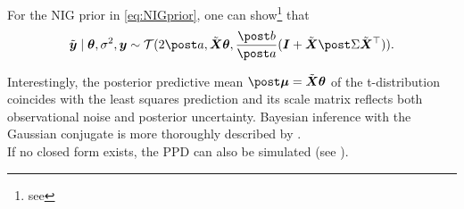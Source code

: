 For the NIG prior in \autoref{eq:NIGprior}, one can show\footnote{see } that
\begin{equation*}
    \ty \mid \btheta, \ssd, \by \sim \Tcal(2 \apo, \tX \btheta, \frac{\bpo}{\apo} (\bI + \tX \Sdpo \tX^\top)).
\end{equation*}

Interestingly, the posterior predictive mean $\mupo = \tX \btheta$ of the t-distribution coincides with the least squares prediction and its scale matrix reflects both observational noise and posterior uncertainty.
Bayesian inference with the Gaussian conjugate is more thoroughly described by \citet{murphy_conjugate_nodate}.\\

If no closed form exists, the PPD can also be simulated (see ).
